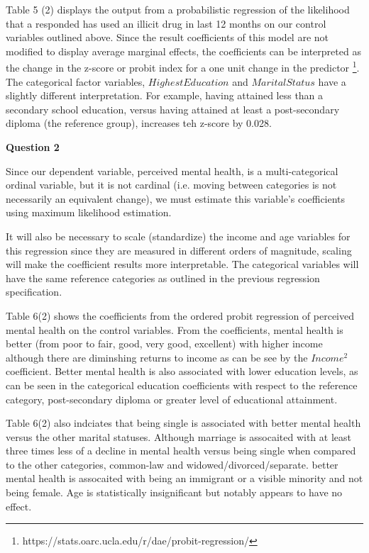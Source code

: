 \documentclass[11pt]{article}
\begin{document}
Table 5 (2) displays the output from a probabilistic regression of the likelihood that a responded has used an illicit drug in last 12 months on our control variables outlined above. Since the result coefficients of this model are not modified to display average marginal effects, the coefficients can be interpreted as the change in the z-score or probit index for a one unit change in the predictor \footnote[1]{https://stats.oarc.ucla.edu/r/dae/probit-regression/}. The categorical factor variables, $HighestEducation$ and $MaritalStatus$ have a slightly different interpretation. For example, having attained less than a secondary school education, versus having attained at least a post-secondary diploma (the reference group), increases teh z-score by 0.028.

\vspace{10 mm}
\textbf{Question 2}

Since our dependent variable, perceived mental health, is a multi-categorical ordinal variable, but it is not cardinal (i.e. moving between categories is not necessarily an equivalent change), we must estimate this variable's coefficients using maximum likelihood estimation.

It will also be necessary to scale (standardize) the income and age variables for this regression since they are measured in different orders of magnitude, scaling will make the coefficient results more interpretable. The categorical variables will have the same reference categories as outlined in the previous regression specification.

Table 6(2) shows the coefficients from the ordered probit regression of perceived mental health on the control variables. From the coefficients, mental health is better (from poor to fair, good, very good, excellent) with higher income although there are diminshing returns to income as can be see by the $Income^2$ coefficient. Better mental health is also associated with lower education levels, as can be seen in the categorical education coefficients with respect to the reference category, post-secondary diploma or greater level of educational attainment.

Table 6(2) also indciates that being single is associated with better mental health versus the other marital statuses. Although marriage is assocaited with at least three times less of a decline in mental health versus being single when compared to the other categories, common-law and widowed/divorced/separate. better mental health is assocaited with being an immigrant or a visible minority and not being female. Age is statistically insignificant but notably appears to have no effect.
\end{document}
